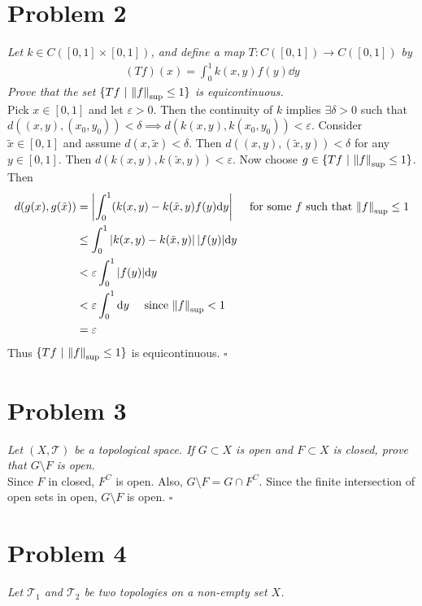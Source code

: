 \documentclass[12pt]{article}
\theoremstyle{plain}
\begin{document}
\section*{Problem 2}
\emph{Let $k \in C([0,1] \times [0,1])$, and define a map $T:C([0,1]) \rightarrow C([0,1])$ by}
\begin{align*}
    (Tf)(x) = \int_0^1 k(x, y)f(y) \dd y
\end{align*}
\emph{Prove that the set $\{Tf\ |\ \norm{f}_\text{sup} \leq 1\}$ is equicontinuous.} \\

Pick $x \in [0,1]$ and let $\varepsilon >0$.  Then the continuity of $k$ implies $\exists \delta >0$ such that $d((x, y), (x_0, y_0)) < \delta \implies d(k(x,y), k(x_0, y_0)) < \varepsilon$.  Consider $\tilde{x} \in [0,1]$ and assume $d(x, \tilde{x})< \delta$.  Then $d((x, y), (\tilde{x}, y)) < \delta$ for any $y \in [0,1]$.  Then $d(k(x, y), k(\tilde{x}, y)) < \varepsilon$.  Now choose $g \in \{Tf\ |\ \norm{f}_\text{sup} \leq 1\}$.  Then
\begin{align*}
    d(g(x), g(\tilde{x})) &= \left|\int_0^1 (k(x, y) - k(\tilde{x}, y)f(y) \dd y\right|\ \ \ \ \text{for some $f$ such that $\norm{f}_\text{sup} \leq 1$} \\
    &\leq \int_0^1 \left|k(x,y) - k(\tilde{x}, y)\right||f(y)|\dd y\\
    &< \varepsilon \int_0^1 |f(y)| \dd y \\
    &< \varepsilon \int_0^1 \dd y \ \ \ \ \text{since $\norm{f}_\text{sup} < 1$} \\
    &= \varepsilon
\end{align*}
Thus $\{Tf\ |\ \norm{f}_\text{sup} \leq 1\}$ is equicontinuous. \hfill $\square$

\section*{Problem 3}
\emph{Let $(X, \mathcal{T})$ be a topological space.  If $G \subset X$ is open and $F \subset X$ is closed, prove that $G \setminus F$ is open.}\\

Since $F$ in closed, $F^C$ is open.  Also, $G\setminus F = G\cap F^C$.  Since the finite intersection of open sets in open, $G\setminus F$ is open. \hfill $\square$

\section*{Problem 4}
\emph{Let $\mathcal{T}_1$ and $\mathcal{T}_2$ be two topologies on a non-empty set $X$.}
\end{document}
